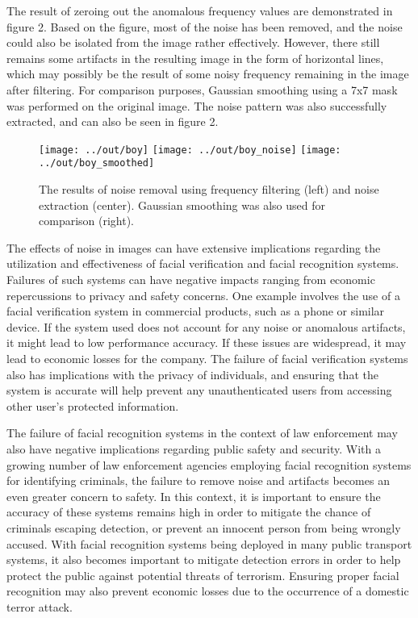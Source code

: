 \documentclass[headings=optiontoheadandtoc,listof=totoc,parskip=full]{scrartcl}
\begin{document}
The result of zeroing out the anomalous frequency values are demonstrated in figure 2. Based on the figure, most of the noise has been removed, and the noise could also be isolated from the image rather effectively. However, there still remains some artifacts in the resulting image in the form of horizontal lines, which may possibly be the result of some noisy frequency remaining in the image after filtering. For comparison purposes, Gaussian smoothing using a 7x7 mask was performed on the original image. The noise pattern was also successfully extracted, and can also be seen in figure 2.

\begin{figure}[H]
	\centering
	\texttt{[image: ../out/boy]}
	\texttt{[image: ../out/boy\_noise]}
	\texttt{[image: ../out/boy\_smoothed]}
	\caption{The results of noise removal using frequency filtering (left) and noise extraction (center). Gaussian smoothing was also used for comparison (right).}
	\label{fig:boy}
\end{figure}

The effects of noise in images can have extensive implications regarding the utilization and effectiveness of facial verification and facial recognition systems. Failures of such systems can have negative impacts ranging from economic repercussions to privacy and safety concerns. One example involves the use of a facial verification system in commercial products, such as a phone or similar device. If the system used does not account for any noise or anomalous artifacts, it might lead to low performance accuracy. If these issues are widespread, it may lead to economic losses for the company. The failure of facial verification systems also has implications with the privacy of individuals, and ensuring that the system is accurate will help prevent any unauthenticated users from accessing other user’s protected information.

The failure of facial recognition systems in the context of law enforcement may also have negative implications regarding public safety and security. With a growing number of law enforcement agencies employing facial recognition systems for identifying criminals, the failure to remove noise and artifacts becomes an even greater concern to safety. In this context, it is important to ensure the accuracy of these systems remains high in order to mitigate the chance of criminals escaping detection, or prevent an innocent person from being wrongly accused. With facial recognition systems being deployed in many public transport systems, it also becomes important to mitigate detection errors in order to help protect the public against potential threats of terrorism. Ensuring proper facial recognition may also prevent economic losses due to the occurrence of a domestic terror attack.
\end{document}
